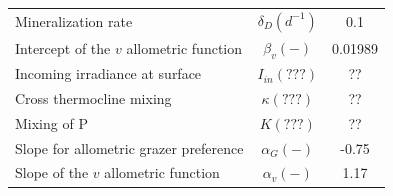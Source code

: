 \begin{table}[H]
\begin{tabular}{lcc}
Mineralization rate                         & $\delta_D (d^{-1})$               & 0.1       \\
Intercept of the $v$ allometric function    & $\beta_v (-)$                     & 0.01989   \\
Incoming irradiance at surface              & $I_{in} (???)$                    & ??        \\
Cross thermocline mixing                    & $\kappa (???)$                    & ??        \\
Mixing of P                                 & $K (???)$                         & ??        \\
Slope for allometric grazer preference      & $\alpha_G (-)$                    & -0.75     \\
Slope of the $v$ allometric function        & $\alpha_v (-)$                    & 1.17      \\
\hline
\end{tabular}
\end{table}

